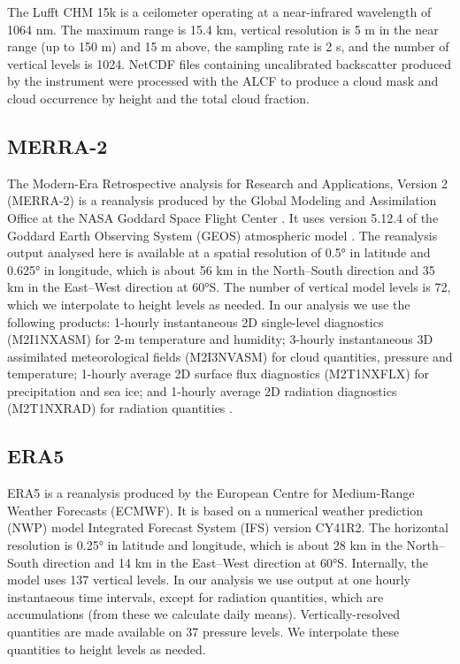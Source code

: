 \documentclass[12pt,a4paper]{article}
\begin{document}
The Lufft CHM 15k is a ceilometer operating at a near-infrared wavelength of
1064 nm. The maximum range is 15.4 km, vertical resolution is 5 m in the near
range (up to 150 m) and 15 m above, the sampling rate is 2 s, and the number of
vertical levels is 1024.  NetCDF files containing uncalibrated backscatter
produced by the instrument were processed with the ALCF to produce a cloud mask
and cloud occurrence by height and the total cloud fraction.


\subsection{MERRA-2}

The Modern-Era Retrospective analysis for Research and Applications, Version 2
(MERRA-2) is a reanalysis produced by the Global Modeling and Assimilation
Office at the NASA Goddard Space Flight Center \citep{gelaro2017}.  It uses
version 5.12.4 of the Goddard Earth Observing System (GEOS) atmospheric
model \citep{rienecker2008,molod2015}. The reanalysis output analysed here is
available at a spatial resolution of 0.5° in latitude and 0.625° in longitude,
which is about 56 km in the North--South direction and 35 km in the East--West
direction at 60°S. The number of vertical model levels is 72, which we
interpolate to height levels as needed. In our analysis we use the following
products: 1-hourly instantaneous 2D single-level diagnostics (M2I1NXASM) for
2-m temperature and humidity; 3-hourly instantaneous 3D assimilated
meteorological fields (M2I3NVASM) for cloud quantities, pressure and
temperature; 1-hourly average 2D surface flux diagnostics (M2T1NXFLX) for
precipitation and sea ice; and 1-hourly average 2D radiation diagnostics
(M2T1NXRAD) for radiation quantities \citep{merra2}.

\subsection{ERA5}

ERA5 \citep{era5} is a reanalysis produced by the European Centre for
Medium-Range Weather Forecasts (ECMWF). It is based on a numerical weather
prediction (NWP) model Integrated Forecast System (IFS) version CY41R2.  The
horizontal resolution is 0.25° in latitude and longitude, which is about
28 km in the North--South direction and 14 km in the East--West direction at
60°S. Internally, the model uses 137 vertical levels. In our analysis we use
output at one hourly instantaeous time intervals, except for radiation
quantities, which are accumulations (from these we calculate daily means).
Vertically-resolved quantities are made available on 37 pressure levels. We
interpolate these quantities to height levels as needed.
\end{document}
